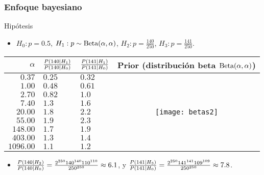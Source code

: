 \documentclass[table]{beamer}
\begin{document}
\begin{frame}
    \frametitle{Enfoque bayesiano}
    \begin{block}{Hipótesis}
        \begin{itemize}
            \item $H_{0}: p = 0.5$, $H_{1}: p \sim \betadist{\alpha}{\alpha}$, $H_{2}: p = \frac{140}{250}$, $H_{3}: p = \frac{141}{250}$.
        \end{itemize}
    \end{block}
    \begin{center}
        \begin{tabular}{r|llc}
            $\alpha$ & $\frac{\prob{140 \mid H_{1}}}{\prob{140 \mid H_{0}}}$ & $\frac{\prob{141 \mid H_{1}}}{\prob{141 \mid H_{0}}}$ & Prior (distribución beta $\betadist{\alpha}{\alpha}$) \\
            \hline
            $0.37$ & $0.25$ & $0.32$ & \multirow{9}{*}{\texttt{[image: betas2]}} \\
            $1.00$ & $\mathbf{0.48}$ & $\mathbf{0.61}$ & \\
            $2.70$ & $0.82$ & $1.0$ & \\
            $7.40$ & $1.3$ & $1.6$ & \\
            $20.00$ & $1.8$ & $2.2$ & \\
            $55.00$ & $\mathbf{1.9}$ & $\mathbf{2.3}$ & \\
            $148.00$ & $1.7$ & $1.9$ & \\
            $403.00$ & $1.3$ & $1.4$ & \\
            $1096.00$ & $1.1$ & $1.2$ &
        \end{tabular}
    \end{center}
    \begin{block}{}%
        \begin{itemize}
            \item $\frac{\prob{140 \mid H_{2}}}{\prob{140 \mid H_{0}}} = \frac{2^{250} 140^{140} 110^{110}}{250^{250}} \approx 6.1$,
                y
                $\frac{\prob{141 \mid H_{3}}}{\prob{141 \mid H_{0}}} = \frac{2^{250} 141^{141} 109^{109}}{250^{250}} \approx 7.8$.
        \end{itemize}
    \end{block}
\end{frame}
\end{document}
